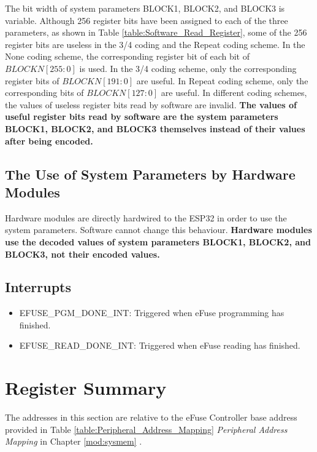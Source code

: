 \documentclass[main\_\_EN.tex]{subfiles}
\begin{document}
\hypertarget{software_read_BLOCKN}{}
The bit width of system parameters BLOCK1, BLOCK2, and BLOCK3 is variable.
Although 256 register bits have been assigned to each of the three parameters, as shown in Table \ref{table:Software_Read_Register}, some of the 256 register bits are useless in the 3/4 coding and the Repeat coding scheme. In the None coding scheme, the corresponding register bit of each bit of \begin{math}BLOCKN[255:0]\end{math} is used.
In the 3/4 coding scheme, only the corresponding register bits of \begin{math}BLOCKN[191:0]\end{math} are useful.
In Repeat coding scheme, only the corresponding bits of \begin{math}BLOCKN[127:0]\end{math} are useful.
In different coding schemes, the values of useless register bits read by software are invalid.
\textbf{The values of useful register bits read by software are the system parameters BLOCK1, BLOCK2, and BLOCK3 themselves instead of their values after being encoded.}



\subsection{The Use of System Parameters by Hardware Modules}

Hardware modules are directly hardwired to the ESP32 in order to use the system parameters. Software cannot change this behaviour.
\textbf{Hardware modules use the decoded values of system parameters BLOCK1, BLOCK2, and BLOCK3, not their encoded values.}

\subsection{Interrupts}
\begin{itemize}
\item \label{int:EFUSEPGMDONEINT}EFUSE\_PGM\_DONE\_INT: Triggered when eFuse programming has finished.
\item \label{int:EFUSEREADDONEINT}EFUSE\_READ\_DONE\_INT: Triggered when eFuse reading has finished.
\end{itemize}

\hypertarget{efuse-reg-summ}{}
\section{Register Summary}
The addresses in this section are relative to the eFuse Controller base address provided in Table \ref{table:Peripheral_Address_Mapping} \textit{Peripheral Address Mapping} in Chapter \ref{mod:sysmem} \textit{}.
\end{document}
